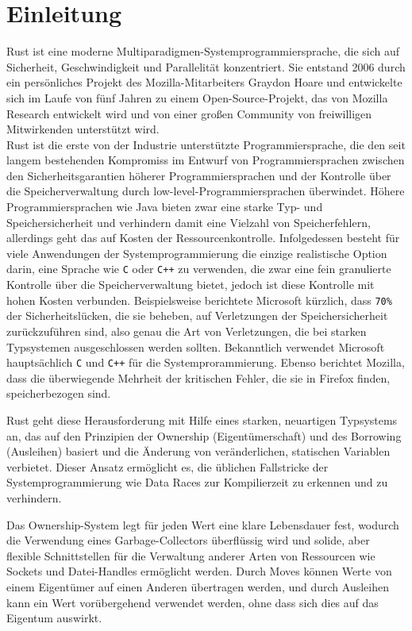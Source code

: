 
\chapter{Einleitung}

\nocite{*}
Rust ist eine moderne Multiparadigmen-Systemprogrammiersprache, die sich auf Sicherheit, Geschwindigkeit und Parallelität konzentriert. Sie entstand 2006 durch ein persönliches Projekt des Mozilla-Mitarbeiters Graydon Hoare und entwickelte sich im Laufe von fünf Jahren zu einem Open-Source-Projekt, das von Mozilla Research entwickelt wird und von einer großen Community von freiwilligen Mitwirkenden unterstützt wird.\autocite{heise-rust}\\
Rust ist die erste von der Industrie unterstützte Programmiersprache, die den seit langem bestehenden Kompromiss im Entwurf von Programmiersprachen zwischen den Sicherheitsgarantien höherer Programmiersprachen und der Kontrolle über die Speicherverwaltung durch low-level-Programmiersprachen überwindet. Höhere Programmiersprachen wie Java bieten zwar eine starke Typ- und Speichersicherheit und verhindern damit eine Vielzahl von Speicherfehlern, allerdings geht das auf Kosten der Ressourcenkontrolle. Infolgedessen besteht für viele Anwendungen der Systemprogrammierung die einzige realistische Option darin, eine Sprache wie \texttt{C} oder \texttt{C++} zu verwenden, die zwar eine fein granulierte Kontrolle über die Speicherverwaltung bietet, jedoch ist diese Kontrolle mit hohen Kosten verbunden. Beispielsweise berichtete Microsoft kürzlich, dass \texttt{70\%} der Sicherheitslücken, die sie beheben, auf Verletzungen der Speichersicherheit zurückzuführen sind,\autocite{microsoft-memory-safety-issues} also genau die Art von Verletzungen, die bei starken Typsystemen ausgeschlossen werden sollten.  Bekanntlich verwendet Microsoft hauptsächlich  \texttt{C} und \texttt{C++} für die Systemprorammierung. Ebenso berichtet Mozilla, dass die überwiegende Mehrheit der kritischen Fehler, die sie in Firefox finden, speicherbezogen sind.\autocite{mozilla-memory-safety-issues}

Rust geht diese Herausforderung mit Hilfe eines starken, neuartigen Typsystems an, das auf den Prinzipien der Ownership (Eigentümerschaft) und des Borrowing (Ausleihen) basiert und die Änderung von veränderlichen, statischen Variablen verbietet. Dieser Ansatz ermöglicht es, die üblichen Fallstricke der Systemprogrammierung wie Data Races zur Kompilierzeit zu erkennen und zu verhindern.

Das Ownership-System legt für jeden Wert eine klare Lebensdauer fest, wodurch die Verwendung eines Garbage-Collectors überflüssig wird und solide, aber flexible Schnittstellen für die Verwaltung anderer Arten von Ressourcen wie Sockets und Datei-Handles ermöglicht werden. Durch \glqq Moves\grqq{} können Werte von einem Eigentümer auf einen Anderen übertragen werden, und durch Ausleihen kann ein Wert vorübergehend verwendet werden, ohne dass sich dies auf das Eigentum auswirkt.

